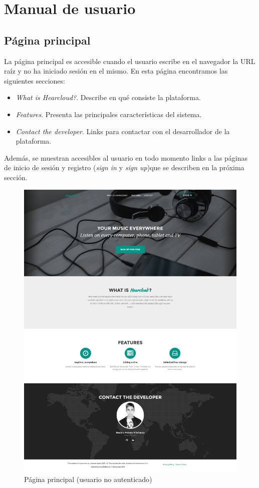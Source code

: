 \section{Manual de usuario}
\label{sec:manual}

\subsection{Página principal}

La página principal es accesible cuando el usuario escribe en el navegador la URL raíz y no ha iniciado sesión en el mismo. En esta página encontramos las siguientes secciones:

\begin{itemize}
	\item \textit{What is Hearcloud?}. Describe en qué consiste la plataforma.
	\item \textit{Features}. Presenta las principales características del sistema.
	\item \textit{Contact the developer}. Links para contactar con el desarrollador de la plataforma.
\end{itemize}

Además, se muestran accesibles al usuario en todo momento links a las páginas de inicio de sesión y registro (\textit{sign in} y \textit{sign up})que se describen en la próxima sección.

\begin{figure}[H] 
\centering 
\includegraphics[scale=0.2]{../images/um/um_1.png}
\caption{Página principal (usuario no autenticado)}
\end{figure}

